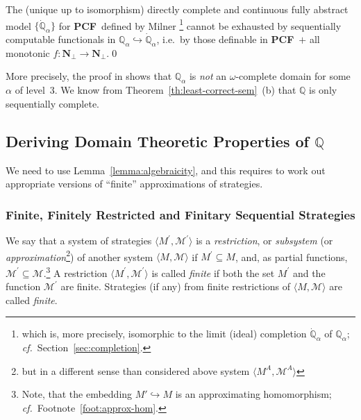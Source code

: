 \documentclass[fleqn]{LMCS}
\theoremstyle{plain}\newtheorem{satz}[thm]{Satz}
\theoremstyle{plain}\newtheorem{hyp}[thm]{Hypothesis}
\theoremstyle{plain}\newtheorem{hyps}[thm]{Hypotheses}
\theoremstyle{definition}\newtheorem{note}[thm]{Note}
\def\cf{{\em cf.}}
\newcommand{\setof}[1]{\{#1\}}
\newcommand{\pr}{^{\prime}}
\newcommand{\arr}{\rightarrow}
\newcommand{\embed}{\hookrightarrow}
\newcommand{\la}{\langle}
\newcommand{\ra}{\rangle}
\newcommand{\tuple}[1]{\la #1 \ra}
\newcommand{\NN}{\mathbf{N}}
\newcommand{\bbQ}{\mathbb{Q}}
\newcommand{\PCF}{\mbox{\bf PCF}}
\newcommand{\MM}{{\mathcal M}}
\newcommand{\dQ}{\dot{\bbQ}}
\newcommand{\?}{\mbox{?}}
\begin{document}
\begin{thm}
\label{th:normann}
The (unique up to isomorphism) directly complete and continuous 
fully abstract model $\setof{\dQ_\alpha}$
for \PCF\ defined by Milner {\em \cite{Milner77}}\footnote{which is, more precisely, isomorphic to the limit (ideal) completion $\dQ_\alpha$ 
of $\bbQ_\alpha$; 
\cf\ Section~\ref{sec:completion}. 
}
cannot be exhausted by sequentially computable functionals 
in $\bbQ_\alpha\embed\dQ_\alpha$, 
i.e.\ by those definable in \PCF\ $+$ all monotonic $f:\NN_\bot\arr \NN_\bot$.\qed
\end{thm}

\noindent
More precisely, the proof in \cite{Normann2004} shows that 
$\bbQ_{\alpha}$ is \emph{not} an $\omega$-complete domain for some $\alpha$ 
of level~3. 
We know from Theorem~\ref{th:least-correct-sem}~(b) that $\bbQ$ 
is only sequentially complete.


\subsection{Deriving Domain Theoretic Properties 
of \texorpdfstring{$\bbQ$}{Q}}

We need to use Lemma~\ref{lemma:algebraicity}, and this requires 
to work out appropriate versions 
of ``finite'' approximations of strategies. 

\subsubsection{Finite, Finitely Restricted and Finitary Sequential Strategies}
\label{sec:ranked-finitary}


\begin{defi}\label{def:restricted}We say that a system of strategies $\tuple{M\pr,\MM\pr}$ 
is a \emph{restriction}, or \emph{subsystem } 
(or \emph{approximation}\footnote{but in a different sense than considered above 
system $\tuple{M^{A},\MM^{A}}$
})
of
another system $\tuple{M,\MM}$ if $M\pr\subseteq M$, 
and, as partial functions, $\MM\pr\subseteq\MM$.\footnote{Note, that the embedding $M'\embed M$ is  
an approximating homomorphism; \cf\ Footnote~\ref{foot:approx-hom}. 
}
A restriction $\tuple{M\pr,\MM\pr}$ is called \emph{finite} if both 
the set $M\pr$ and the function $\MM\pr$ are finite. 
Strategies (if any) from finite restrictions of $\tuple{M,\MM}$ are called 
\emph{finite}. 
\end{defi}
\end{document}
